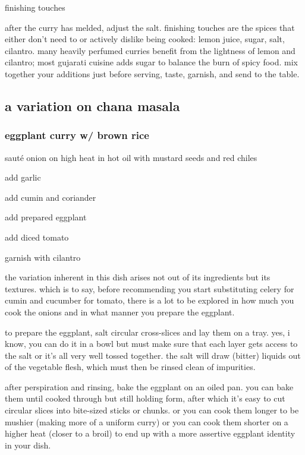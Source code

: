 \begin{algorithm}
  \item finishing touches

  after the curry has melded, adjust the salt. finishing touches are the spices 
  that either don't need to or actively dislike being cooked: lemon juice, 
  sugar, salt, cilantro. many heavily perfumed curries benefit from the 
  lightness of lemon and cilantro; most gujarati cuisine adds sugar to balance 
  the burn of spicy food. mix together your additions just before serving, 
  taste, garnish, and send to the table.
\end{algorithm}

\subsection{a variation on chana masala}

\subsubsection{eggplant curry w/ brown rice}

\begin{algorithm}
  \item saut\'{e} onion on high heat in hot oil with mustard seeds and red chiles
  \item add garlic
  \item add cumin and coriander
  \item add prepared eggplant
  \item add diced tomato
  \item garnish with cilantro
\end{algorithm}

the variation inherent in this dish arises not out of its ingredients but its 
textures. which is to say, before recommending you start substituting celery 
for cumin and cucumber for tomato, there is a lot to be explored in how much 
you cook the onions and in what manner you prepare the eggplant.

to prepare the eggplant, salt circular cross-slices and lay them on a tray. 
yes, i know, you can do it in a bowl but must make sure that each layer gets 
access to the salt or it's all very well tossed together. the salt will draw 
(bitter) liquids out of the vegetable flesh, which must then be rinsed clean of 
impurities.

after perspiration and rinsing, bake the eggplant on an oiled pan. you can bake 
them until cooked through but still holding form, after which it's easy to cut 
circular slices into bite-sized sticks or chunks. or you can cook them longer 
to be mushier (making more of a uniform curry) or you can cook them shorter on 
a higher heat (closer to a broil) to end up with a more assertive eggplant 
identity in your dish.


